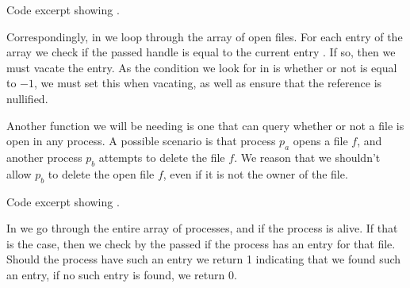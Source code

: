 {Code excerpt showing .}

Correspondingly, in  we loop through the
array of open files. For each entry of the array we check if the passed handle
is equal to the current entry . If so, then we must vacate
the entry. As the condition we look for in  is
whether or not  is equal to $-1$, we must set this when
vacating, as well as ensure that the  reference is nullified.

\newpage
Another function we will be needing is one that can query whether or not a
file is open in any process. A possible scenario is that process $p_a$ opens a
file $f$, and another process $p_b$ attempts to delete the file $f$. We reason
that we shouldn't allow $p_b$ to delete the open file $f$, even if it is not
the owner of the file.

{Code excerpt showing .}

In  we go through the entire array of processes,
and if the process is alive. If that is the case, then we check by the passed
 if the process has an entry for that file. Should the process
have such an entry we return 1 indicating that we found such an entry, if no
such entry is found, we return 0.
